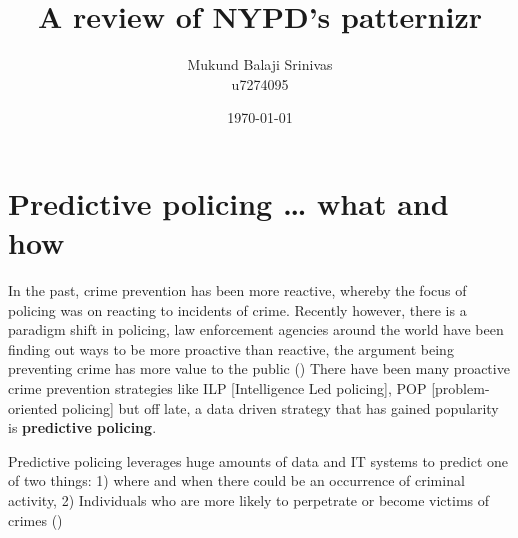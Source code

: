 \documentclass[a4paper,14pt]{extarticle}
\title{A review of NYPD's patternizr}
\author{Mukund Balaji Srinivas \\ u7274095}
\date{\today  }
\begin{document}
\begin{titlepage}
\maketitle
\end{titlepage}
\section*{Predictive policing … what and how }
\begin{justifying}
In the past, crime prevention has been more reactive, whereby the focus of policing was on reacting to incidents of crime. Recently however, there is a paradigm shift in policing, law enforcement agencies around the world have been finding out ways to be more proactive than reactive, the argument being preventing crime has more value to the public (\cite{Mugari21}) There have been many proactive crime prevention strategies like ILP [Intelligence Led policing], POP [problem-oriented policing] but off late, a data driven strategy that has gained popularity is \textbf{predictive policing}.\vspace{1em}

Predictive policing leverages huge amounts of data and IT systems to predict one of two things: 1) where and when there could be an occurrence of criminal activity, 2) Individuals who are more likely to perpetrate or become victims of crimes (\cite{Hartlein21})
\end{justifying}
\end{document}
